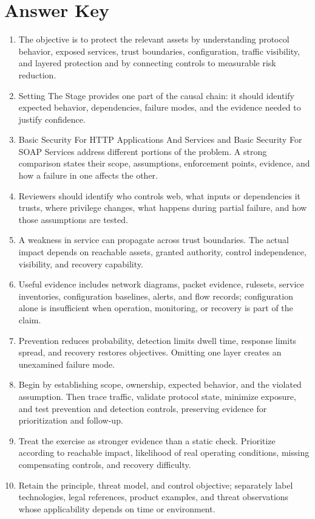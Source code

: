 \documentclass[11pt]{article}
\begin{document}
\section*{Answer Key}
\begin{enumerate}
\item The objective is to protect the relevant assets by understanding protocol behavior, exposed services, trust boundaries, configuration, traffic visibility, and layered protection and by connecting controls to measurable risk reduction.
\item Setting The Stage provides one part of the causal chain: it should identify expected behavior, dependencies, failure modes, and the evidence needed to justify confidence.
\item Basic Security For HTTP Applications And Services and Basic Security For SOAP Services address different portions of the problem. A strong comparison states their scope, assumptions, enforcement points, evidence, and how a failure in one affects the other.
\item Reviewers should identify who controls web, what inputs or dependencies it trusts, where privilege changes, what happens during partial failure, and how those assumptions are tested.
\item A weakness in service can propagate across trust boundaries. The actual impact depends on reachable assets, granted authority, control independence, visibility, and recovery capability.
\item Useful evidence includes network diagrams, packet evidence, rulesets, service inventories, configuration baselines, alerts, and flow records; configuration alone is insufficient when operation, monitoring, or recovery is part of the claim.
\item Prevention reduces probability, detection limits dwell time, response limits spread, and recovery restores objectives. Omitting one layer creates an unexamined failure mode.
\item Begin by establishing scope, ownership, expected behavior, and the violated assumption. Then trace traffic, validate protocol state, minimize exposure, and test prevention and detection controls, preserving evidence for prioritization and follow-up.
\item Treat the exercise as stronger evidence than a static check. Prioritize according to reachable impact, likelihood of real operating conditions, missing compensating controls, and recovery difficulty.
\item Retain the principle, threat model, and control objective; separately label technologies, legal references, product examples, and threat observations whose applicability depends on time or environment.
\end{enumerate}
\end{document}
